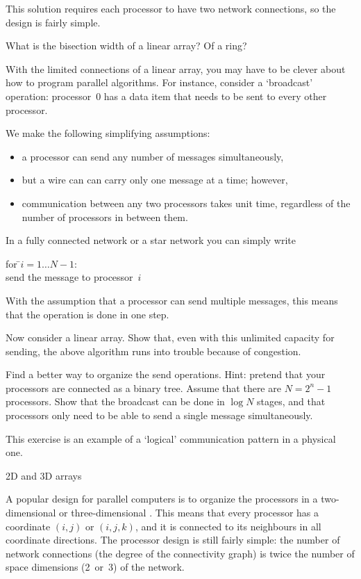 This solution requires each processor to have two network connections,
so the design is fairly simple.

\begin{exercise}
  What is the bisection width of a linear array? Of a ring?
\end{exercise}

\begin{exercise}
  With the limited connections of a linear array, you may have to be
  clever about how to program parallel algorithms. For instance,
  consider a `broadcast' operation: processor~$0$ has a data item that
  needs to be sent to every other processor. 

  We make the following simplifying assumptions:
  \begin{itemize}
  \item a processor can send any number of messages simultaneously,
  \item but a wire can can carry only one message at a time; however,
    \item communication between any two processors takes unit time,
      regardless of the number of processors in between them.
  \end{itemize}

  In a fully connected network or a star network
  you can simply write
  \begin{tabbing}
    for \=$i=1\ldots N-1$:\\ \>send the message to processor~$i$
  \end{tabbing}
  With the assumption that a processor can send multiple messages,
  this means that the operation is done in one step.

  Now consider a linear array. Show that, even with this unlimited capacity for
  sending, the above algorithm runs into trouble because of congestion.

  Find a better way to organize the send operations. Hint: pretend
  that your processors are connected as a binary tree. Assume that
  there are $N=2^n-1$ processors.
  Show that the broadcast can be done in $\log N$ stages, and that
  processors only need to be able to send a single message simultaneously.
\end{exercise}
This exercise is an example of  a
`logical' communication pattern in a physical one.

 {2D and 3D arrays}

A popular design for parallel computers is to organize the processors
in a two-dimensional or three-dimensional .
This means that every processor has a coordinate $(i,j)$ or $(i,j,k)$,
and it is connected to its neighbours in all coordinate directions.
The processor design is still fairly simple: the number of network
connections (the degree of the connectivity graph) is twice the number
of space dimensions (2~or~3) of the network.

